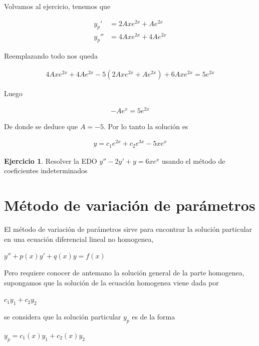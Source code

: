 \documentclass{article}
\theoremstyle{plain}
\theoremstyle{definition}
\newtheorem{ejer}[thm]{Ejercicio}
\begin{document}
Volvamos al ejercicio, tenemos que

\begin{align*}
    y_p' &= 2Axe^{2x}+Ae^{2x} \\
     y_p'' &= 4Axe^{2x}+4Ae^{2x}
\end{align*}


Reemplazando todo nos queda

\begin{align*}
    4Axe^{2x}+4Ae^{2x}-5(2Axe^{2x}+Ae^{2x})+6Axe^{2x}=5e^{2x}
\end{align*}

Luego

\begin{align*}
    -Ae^x=5e^{2x}
\end{align*}

De donde se deduce que $A=-5$. Por lo tanto la solución es

\begin{align*}
    y=c_1e^{2x}+c_2e^{3x}-5xe^x
\end{align*}

\begin{ejer}Resolver la EDO $y''-2y'+y=6xe^{x}$ usando el método de coeficientes indeterminados \\
\end{ejer}



\section{Método de variación de parámetros}

El método de variación de parámetros sirve para encontrar la solución particular en una ecuación diferencial lineal no homogenea,

\begin{center}
$y''+p(x)y'+q(x)y=f(x)$
\end{center}

Pero requiere conocer de antemano la solución general de la parte homogenea, supongamos que la solución de la ecuación homogenea viene dada por

\begin{center}
$ c_1y_1+c_2y_2$
\end{center}

se considera que la solución particular $y_p$ es de la forma

\begin{center}
$y_p= c_1(x)y_1 +c_2(x)y_2$
\end{center}
\end{document}
